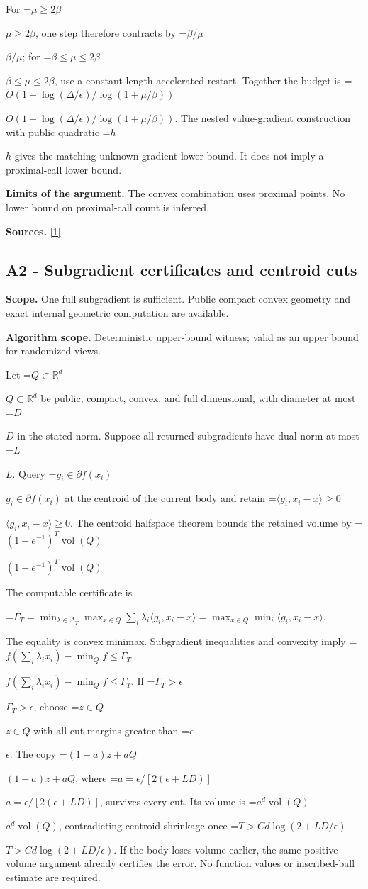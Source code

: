 \documentclass[10pt,a4paper]{article}
\newcommand{\AtlasMath}[1]{\par\begingroup\centering\setbox0=\hbox{$\displaystyle #1$}\ifdim\wd0>1.4\linewidth\typeout{ATLAS WIDE FORMULA: \the\wd0}\fi\ifdim\wd0>\linewidth\resizebox{\linewidth}{!}{\box0}\else\box0\fi\par\endgroup}
\newcommand{\AtlasInlineMath}[1]{\begingroup\setbox0=\hbox{$#1$}\ifdim\wd0>.4\linewidth\endgroup\AtlasMath{#1}\else\endgroup$#1$\fi}
\begin{document}
For \AtlasInlineMath{\mu\ge2\beta}, one step therefore contracts by \AtlasInlineMath{\beta/\mu}; for \AtlasInlineMath{\beta\le\mu\le2\beta}, use a constant-length accelerated restart. Together the budget is
\AtlasInlineMath{O(1+\log(\Delta/\epsilon)/\log(1+\mu/\beta))}.
The nested value-gradient construction with public quadratic \AtlasInlineMath{h} gives the matching unknown-gradient lower bound. It does not imply a proximal-call lower bound.

\textbf{Limits of the argument.} The convex combination uses proximal points. No lower bound on proximal-call count is inferred.

\textbf{Sources.} \href{https://www.tau.ac.il/~becka/FISTA.pdf}{[1]}

\subsection{A2 - Subgradient certificates and centroid cuts}
\textbf{Scope.} One full subgradient is sufficient. Public compact convex geometry and exact internal geometric computation are available.

\textbf{Algorithm scope.} Deterministic upper-bound witness; valid as an upper bound for randomized views.

Let \AtlasInlineMath{Q\subset\mathbb R^d} be public, compact, convex, and full dimensional, with diameter at most \AtlasInlineMath{D} in the stated norm. Suppose all returned subgradients have dual norm at most \AtlasInlineMath{L}. Query \AtlasInlineMath{g_i\in\partial f(x_i)} at the centroid of the current body and retain \AtlasInlineMath{\langle g_i,x_i-x\rangle\ge0}. The centroid halfspace theorem bounds the retained volume by \AtlasInlineMath{(1-e^{-1})^T\operatorname{vol}(Q)}.

The computable certificate is

\AtlasMath{\Gamma_T=\min_{\lambda\in\Delta_T}\max_{x\in Q}\sum_i\lambda_i\langle g_i,x_i-x\rangle
=\max_{x\in Q}\min_i\langle g_i,x_i-x\rangle.}

The equality is convex minimax. Subgradient inequalities and convexity imply
\AtlasInlineMath{f(\sum_i\lambda_ix_i)-\min_Qf\le\Gamma_T}.
If \AtlasInlineMath{\Gamma_T>\epsilon}, choose \AtlasInlineMath{z\in Q} with all cut margins greater than \AtlasInlineMath{\epsilon}. The copy \AtlasInlineMath{(1-a)z+aQ}, where \AtlasInlineMath{a=\epsilon/[2(\epsilon+LD)]}, survives every cut. Its volume is \AtlasInlineMath{a^d\operatorname{vol}(Q)}, contradicting centroid shrinkage once \AtlasInlineMath{T>C d\log(2+LD/\epsilon)}. If the body loses volume earlier, the same positive-volume argument already certifies the error. No function values or inscribed-ball estimate are required.
\end{document}
